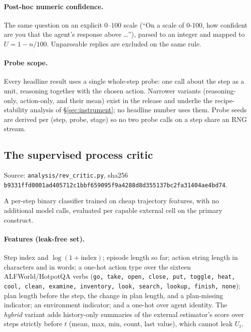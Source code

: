 \paragraph{Post-hoc numeric confidence.} The same question on an explicit
$0$--$100$ scale (``On a scale of 0-100, how confident are you that the agent's
response above \ldots''), parsed to an integer and mapped to
$U = 1 - n/100$. Unparseable replies are excluded on the same rule.

\paragraph{Probe scope.} Every headline result uses a single whole-step
probe: one call about the step as a unit, reasoning together with the chosen
action. Narrower variants (reasoning-only, action-only, and their mean) exist
in the release and underlie the recipe-stability analysis of
\S\ref{sec:instrument}; no headline number uses them. Probe
seeds are derived per (step, probe, stage) so no two probe calls on a step share
an RNG stream.

\subsection{The supervised process critic}\label{app:methods:critic}

Source: \texttt{analysis/rev\_critic.py}, sha256
\texttt{b9331ffd0001ad405712c1bbf659095f9a4288d8d355137bc2fa31404ae4bd74}.

A per-step binary classifier trained on cheap trajectory features, with no
additional model calls, evaluated per capable external cell on the primary
construct.

\paragraph{Features (leak-free set).} Step index and $\log(1+\mathrm{index})$;
episode length so far; action string length in characters and in words; a one-hot
action type over the sixteen ALFWorld/HotpotQA verbs
(\texttt{go, take, open, close, put, toggle, heat, cool, clean, examine,
inventory, look, search, lookup, finish, none}); plan length before the step, the
change in plan length, and a plan-missing indicator; an environment indicator; and
a one-hot over agent identity. The \emph{hybrid} variant adds history-only
summaries of the external estimator's score over steps strictly before $t$
(mean, max, min, count, last value), which cannot leak $U_t$.

